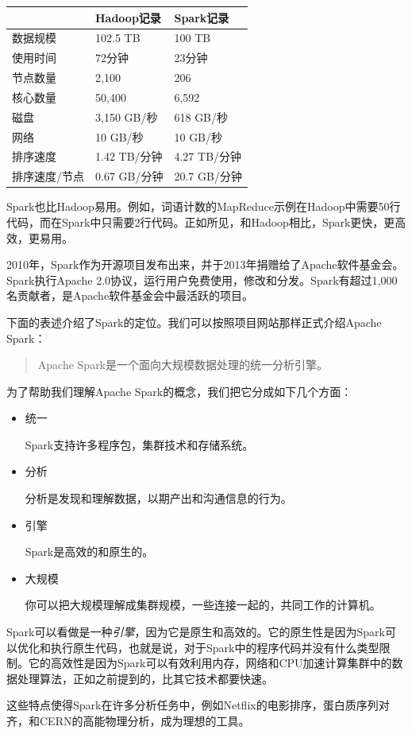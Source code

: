 \documentclass[
]{article}
\begin{document}
\begin{longtable}[]{@{}lll@{}}
\toprule
& Hadoop记录 & Spark记录\tabularnewline
\midrule
\endhead
数据规模 & 102.5 TB & 100 TB\tabularnewline
使用时间 & 72分钟 & 23分钟\tabularnewline
节点数量 & 2,100 & 206\tabularnewline
核心数量 & 50,400 & 6,592\tabularnewline
磁盘 & 3,150 GB/秒 & 618 GB/秒\tabularnewline
网络 & 10 GB/秒 & 10 GB/秒\tabularnewline
排序速度 & 1.42 TB/分钟 & 4.27 TB/分钟\tabularnewline
排序速度/节点 & 0.67 GB/分钟 & 20.7 GB/分钟\tabularnewline
\bottomrule
\end{longtable}

Spark也比Hadoop易用。例如，词语计数的MapReduce示例在Hadoop中需要50行代码，而在Spark中只需要2行代码。正如所见，和Hadoop相比，Spark更快，更高效，更易用。

2010年，Spark作为开源项目发布出来，并于2013年捐赠给了Apache软件基金会。Spark执行Apache
2.0协议，运行用户免费使用，修改和分发。Spark有超过1,000名贡献者，是Apache软件基金会中最活跃的项目。

下面的表述介绍了Spark的定位。我们可以按照项目网站那样正式介绍Apache
Spark：

\begin{quote}
Apache Spark是一个面向大规模数据处理的统一分析引擎。
\end{quote}

为了帮助我们理解Apache Spark的概念，我们把它分成如下几个方面：

\begin{itemize}
\item
  统一

  Spark支持许多程序包，集群技术和存储系统。
\item
  分析

  分析是发现和理解数据，以期产出和沟通信息的行为。
\item
  引擎

  Spark是高效的和原生的。
\item
  大规模

  你可以把大规模理解成集群规模，一些连接一起的，共同工作的计算机。
\end{itemize}

Spark可以看做是一种\emph{引擎}，因为它是原生和高效的。它的原生性是因为Spark可以优化和执行原生代码，也就是说，对于Spark中的程序代码并没有什么类型限制。它的高效性是因为Spark可以有效利用内存，网络和CPU加速计算集群中的数据处理算法，正如之前提到的，比其它技术都要快速。

这些特点使得Spark在许多分析任务中，例如Netflix的电影排序，蛋白质序列对齐，和CERN的高能物理分析，成为理想的工具。
\end{document}
